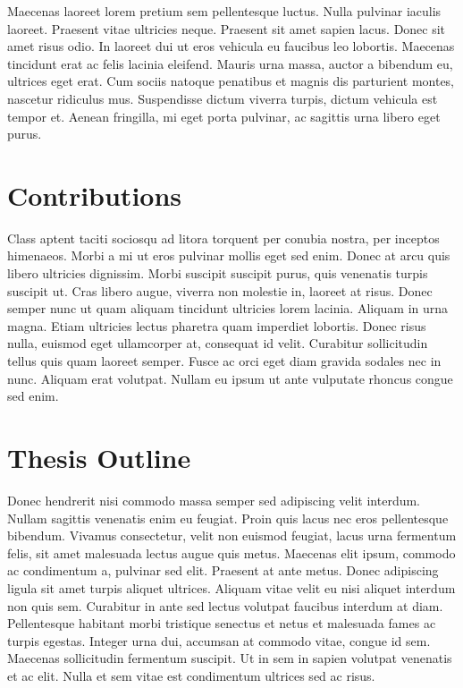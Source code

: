 
Maecenas laoreet lorem pretium sem pellentesque luctus. Nulla pulvinar iaculis laoreet. Praesent vitae ultricies neque. Praesent sit amet sapien lacus. Donec sit amet risus odio. In laoreet dui ut eros vehicula eu faucibus leo lobortis. Maecenas tincidunt erat ac felis lacinia eleifend. Mauris urna massa, auctor a bibendum eu, ultrices eget erat. Cum sociis natoque penatibus et magnis dis parturient montes, nascetur ridiculus mus. Suspendisse dictum viverra turpis, dictum vehicula est tempor et. Aenean fringilla, mi eget porta pulvinar, ac sagittis urna libero eget purus.

\section{Contributions}


Class aptent taciti sociosqu ad litora torquent per conubia nostra, per inceptos himenaeos. Morbi a mi ut eros pulvinar mollis eget sed enim. Donec at arcu quis libero ultricies dignissim. Morbi suscipit suscipit purus, quis venenatis turpis suscipit ut. Cras libero augue, viverra non molestie in, laoreet at risus. Donec semper nunc ut quam aliquam tincidunt ultricies lorem lacinia. Aliquam in urna magna. Etiam ultricies lectus pharetra quam imperdiet lobortis. Donec risus nulla, euismod eget ullamcorper at, consequat id velit. Curabitur sollicitudin tellus quis quam laoreet semper. Fusce ac orci eget diam gravida sodales nec in nunc. Aliquam erat volutpat. Nullam eu ipsum ut ante vulputate rhoncus congue sed enim.

\section{Thesis Outline}


Donec hendrerit nisi commodo massa semper sed adipiscing velit interdum. Nullam sagittis venenatis enim eu feugiat. Proin quis lacus nec eros pellentesque bibendum. Vivamus consectetur, velit non euismod feugiat, lacus urna fermentum felis, sit amet malesuada lectus augue quis metus. Maecenas elit ipsum, commodo ac condimentum a, pulvinar sed elit. Praesent at ante metus. Donec adipiscing ligula sit amet turpis aliquet ultrices. Aliquam vitae velit eu nisi aliquet interdum non quis sem. Curabitur in ante sed lectus volutpat faucibus interdum at diam. Pellentesque habitant morbi tristique senectus et netus et malesuada fames ac turpis egestas. Integer urna dui, accumsan at commodo vitae, congue id sem. Maecenas sollicitudin fermentum suscipit. Ut in sem in sapien volutpat venenatis et ac elit. Nulla et sem vitae est condimentum ultrices sed ac risus.